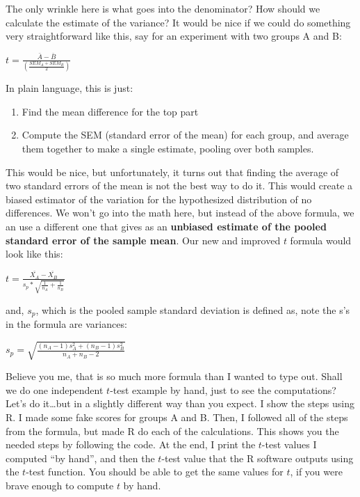\documentclass[
]{book}
\providecommand{\tightlist}{%
  \setlength{\itemsep}{0pt}\setlength{\parskip}{0pt}}
\begin{document}
The only wrinkle here is what goes into the denominator? How should we calculate the estimate of the variance? It would be nice if we could do something very straightforward like this, say for an experiment with two groups A and B:

\(t = \frac{\bar{A}-\bar{B}}{(\frac{SEM_A+SEM_B}{2})}\)

In plain language, this is just:

\begin{enumerate}
\def\labelenumi{\arabic{enumi}.}
\tightlist
\item
  Find the mean difference for the top part
\item
  Compute the SEM (standard error of the mean) for each group, and average them together to make a single estimate, pooling over both samples.
\end{enumerate}

This would be nice, but unfortunately, it turns out that finding the average of two standard errors of the mean is not the best way to do it. This would create a biased estimator of the variation for the hypothesized distribution of no differences. We won't go into the math here, but instead of the above formula, we an use a different one that gives as an \textbf{unbiased estimate of the pooled standard error of the sample mean}. Our new and improved \(t\) formula would look like this:

\(t = \frac{\bar{X_A}-\bar{X_B}}{s_p * \sqrt{\frac{1}{n_A} + \frac{1}{n_B}}}\)

and, \(s_p\), which is the pooled sample standard deviation is defined as, note the s's in the formula are variances:

\(s_p = \sqrt{\frac{(n_A-1)s_A^2 + (n_B-1)s^2_B}{n_A +n_B -2}}\)

Believe you me, that is so much more formula than I wanted to type out. Shall we do one independent \(t\)-test example by hand, just to see the computations? Let's do it\ldots but in a slightly different way than you expect. I show the steps using R. I made some fake scores for groups A and B. Then, I followed all of the steps from the formula, but made R do each of the calculations. This shows you the needed steps by following the code. At the end, I print the \(t\)-test values I computed ``by hand'', and then the \(t\)-test value that the R software outputs using the \(t\)-test function. You should be able to get the same values for \(t\), if you were brave enough to compute \(t\) by hand.
\end{document}
